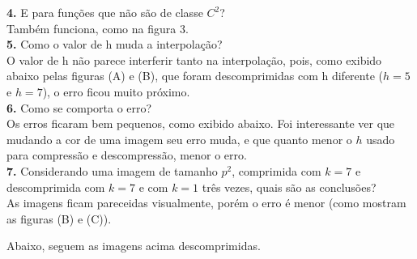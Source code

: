 \documentclass[12pt,letterpaper]{article}
\begin{document}
    \textbf{4.} E para funções que não são de classe $C^2$? \\
    Também funciona, como na figura 3.\\

    \textbf{5.} Como o valor de h muda a interpolação? \\
    O valor de h não parece interferir tanto na interpolação, pois, como exibido abaixo pelas figuras (A) e (B), que foram descomprimidas com h diferente ($h = 5$ e $h = 7$), o erro ficou muito próximo.\\

    \textbf{6.} Como se comporta o erro?\\
    Os erros ficaram bem pequenos, como exibido abaixo. Foi interessante ver que mudando a cor de uma imagem seu erro muda, e que quanto menor o $h$ usado para compressão e descompressão, menor o erro. \\

    \textbf{7.} Considerando uma imagem de tamanho $p^2$, comprimida com $k = 7$ e descomprimida com $k = 7$ e com $k = 1$ três vezes, quais são as conclusões?\\
    As imagens ficam pareceidas visualmente, porém o erro é menor (como mostram as figuras (B) e (C)).

    Abaixo, seguem as imagens acima descomprimidas.

    \begin{figure}[h]
    \end{figure}

    \begin{figure}[h]
    \end{figure}

    \begin{figure}[h]
    \end{figure}
\end{document}
